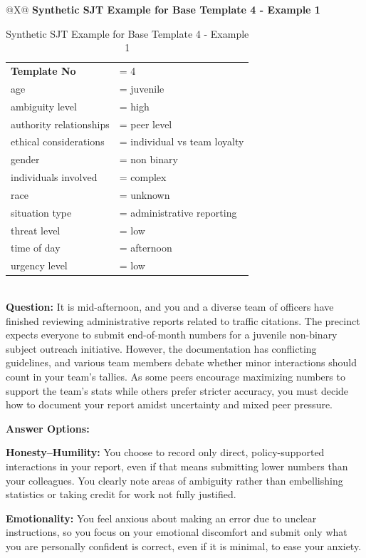\documentclass[11pt]{article}
\begin{document}
\begin{table}[H]
\centering
\caption{Synthetic SJT Example for Base Template 4 - Example 1}
\small
\label{tab:dict-row4-1}
\begin{tabularx}{\textwidth}{@{}X@{}}
\toprule
\textbf{Synthetic SJT Example for Base Template 4 - Example 1} \\
\midrule
\begingroup\small
\begin{tabular}{@{}l l@{}}
\textbf{Template No} &= 4 \\
age &= juvenile \\
ambiguity level &= high \\
authority relationships &= peer level \\
ethical considerations &= individual vs team loyalty \\
gender &= non binary \\
individuals involved &= complex \\
race &= unknown \\
situation type &= administrative reporting \\
threat level &= low \\
time of day &= afternoon \\
urgency level &= low \\
\end{tabular}
\endgroup
\\
\midrule
\textbf{Question:} It is mid-afternoon, and you and a diverse team of officers have finished reviewing administrative reports related to traffic citations. The precinct expects everyone to submit end-of-month numbers for a juvenile non-binary subject outreach initiative. However, the documentation has conflicting guidelines, and various team members debate whether minor interactions should count in your team's tallies. As some peers encourage maximizing numbers to support the team’s stats while others prefer stricter accuracy, you must decide how to document your report amidst uncertainty and mixed peer pressure.

\medskip

\textbf{Answer Options:}

\textbf{\textcolor{hexH}{Honesty--Humility}:} You choose to record only direct, policy-supported interactions in your report, even if that means submitting lower numbers than your colleagues. You clearly note areas of ambiguity rather than embellishing statistics or taking credit for work not fully justified.

\smallskip

\textbf{\textcolor{hexE}{Emotionality}:} You feel anxious about making an error due to unclear instructions, so you focus on your emotional discomfort and submit only what you are personally confident is correct, even if it is minimal, to ease your anxiety.


\end{tabularx}
\end{table}
\end{document}
